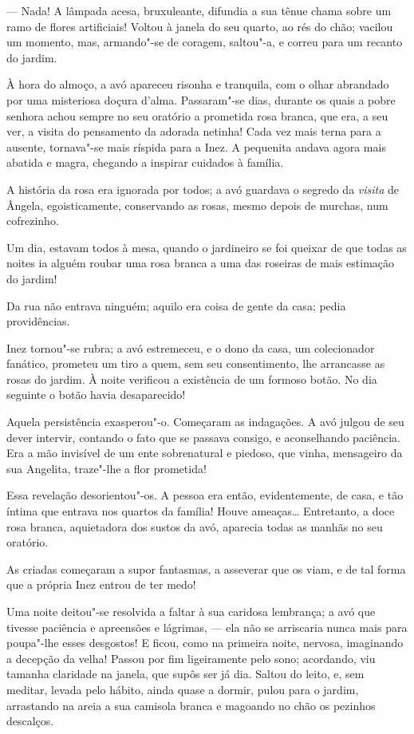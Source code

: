 --- Nada! A lâmpada acesa, bruxuleante, difundia a sua tênue chama sobre
um ramo de flores artificiais! Voltou à janela do seu quarto, ao rés do
chão; vacilou um momento, mas, armando"-se de coragem, saltou"-a, e correu
para um recanto do jardim.

À hora do almoço, a avó apareceu risonha e tranquila, com o olhar
abrandado por uma misteriosa doçura d'alma. Passaram"-se dias, durante os
quais a pobre senhora achou sempre no seu oratório a prometida rosa
branca, que era, a seu ver, a visita do pensamento da adorada netinha!
Cada vez mais terna para a ausente, tornava"-se mais ríspida para a Inez.
A pequenita andava agora mais abatida e magra, chegando a inspirar
cuidados à família.

A história da rosa era ignorada por todos; a avó guardava o segredo da
\emph{visita} de Ângela, egoisticamente, conservando as rosas, mesmo
depois de murchas, num cofrezinho.

Um dia, estavam todos à mesa, quando o jardineiro se foi queixar de que
todas as noites ia alguém roubar uma rosa branca a uma das roseiras de
mais estimação do jardim!

Da rua não entrava ninguém; aquilo era coisa de gente da casa; pedia
providências.

Inez tornou"-se rubra; a avó estremeceu, e o dono da casa, um
colecionador fanático, prometeu um tiro a quem, sem seu consentimento,
lhe arrancasse as rosas do jardim. À noite verificou a existência de um
formoso botão. No dia seguinte o botão havia desaparecido!

Aquela persistência exasperou"-o. Começaram as indagações. A avó julgou
de seu dever intervir, contando o fato que se passava consigo, e
aconselhando paciência. Era a mão invisível de um ente sobrenatural e
piedoso, que vinha, mensageiro da sua Angelita, traze"-lhe a flor
prometida!

Essa revelação desorientou"-os. A pessoa era então, evidentemente, de
casa, e tão íntima que entrava nos quartos da família! Houve ameaças\ldots{}
Entretanto, a doce rosa branca, aquietadora dos sustos da avó, aparecia
todas as manhãs no seu oratório.

As criadas começaram a supor fantasmas, a asseverar que os viam, e de
tal forma que a própria Inez entrou de ter medo!

Uma noite deitou"-se resolvida a faltar à sua caridosa lembrança; a avó
que tivesse paciência e apreensões e lágrimas, --- ela não se arriscaria
nunca mais para poupa"-lhe esses desgostos! E ficou, como na primeira
noite, nervosa, imaginando a decepção da velha! Passou por fim
ligeiramente pelo sono; acordando, viu tamanha claridade na janela, que
supôs ser já dia. Saltou do leito, e, sem meditar, levada pelo hábito,
ainda quase a dormir, pulou para o jardim, arrastando na areia a sua
camisola branca e magoando no chão os pezinhos descalços.

